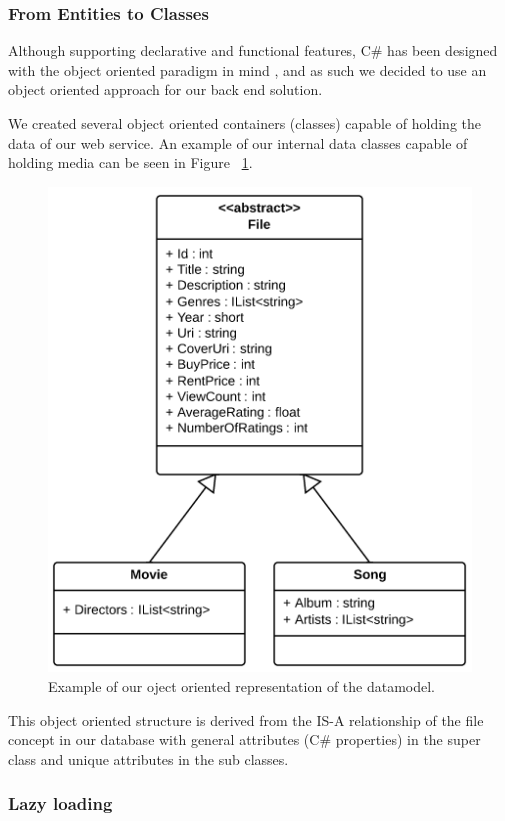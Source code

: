 \subsubsection{From Entities to Classes}
Although supporting declarative and functional features, C\# has been designed with the object oriented paradigm in mind \cite{csharpecma}, and as such we decided to use an object oriented approach for our back end solution. 

We created several object oriented containers (classes) capable of holding the data of our web service. An example of our internal data classes capable of holding media can be seen in Figure ~\ref{fig:orm}.
\begin{figure}[h]
	\centering
	\includegraphics[scale=0.7]{./p1design/orm.png}
	\caption{Example of our oject oriented representation of the datamodel.}
	\label{fig:orm}
\end{figure}

This object oriented structure is derived from the IS-A relationship of the file concept in our database with general attributes (C\# properties) in the super class and unique attributes in the sub classes.

\subsubsection{Lazy loading}

